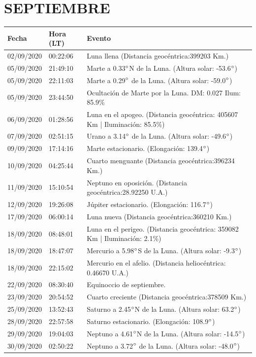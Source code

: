 \documentclass[12pt,a4paper,oneside]{article}
\begin{document}
\section{SEPTIEMBRE}
\begin{center}
\begin{tabular}{ |l| l| l| }
\hline
 \textbf{Fecha} & \textbf{Hora (LT)} & \textbf{Evento}\\
 \hline
02/09/2020 &  00:22:06   &  Luna llena (Distancia geocéntrica:399203 Km.)	  \\
05/09/2020 &  21:49:10   &  Marte a 0.33$\degree$N de la Luna. (Altura solar: -53.6$\degree$)	  \\
05/09/2020 &  22:11:03   &  Marte a 0.29$\degree$ de la Luna. (Altura solar: -59.0$\degree$)	  \\
05/09/2020 &  23:44:50   &  Ocultación de Marte por la Luna. DM: 0.027 Ilum: 85.9\%   \\
06/09/2020 &  01:28:56   &  Luna en el apogeo. (Distancia geocéntrica: 405607 Km | Iluminación: 85.5\%)	  \\
07/09/2020 &  02:51:15   &  Urano a 3.14$\degree$ de la Luna. (Altura solar: -49.6$\degree$)	  \\
09/09/2020 &  17:14:16   &  Marte estacionario. (Elongación: 139.4$\degree$)	  \\
10/09/2020 &  04:25:44   &  Cuarto menguante (Distancia geocéntrica:396234 Km.)	  \\
11/09/2020 &  15:10:54   &  Neptuno en oposición. (Distancia geocéntrica:28.92250 U.A.)	  \\
12/09/2020 &  19:26:08   &  Júpiter estacionario. (Elongación: 116.7$\degree$)	  \\
17/09/2020 &  06:00:14   &  Luna nueva (Distancia geocéntrica:360210 Km.)	  \\
18/09/2020 &  08:48:01   &  Luna en el perigeo. (Distancia geocéntrica: 359082 Km | Iluminación: 2.1\%)	  \\
18/09/2020 &  18:47:07   &  Mercurio a 5.98$\degree$S de la Luna. (Altura solar: -9.3$\degree$)	  \\ 
18/09/2020 &  22:15:02   &  Mercurio en el afelio. (Distancia heliocéntrica: 0.46670 U.A.)	  \\ 
22/09/2020 &  08:30:40   &  Equinoccio de septiembre.	  \\
23/09/2020 &  20:54:52   &  Cuarto creciente (Distancia geocéntrica:378509 Km.)	  \\
25/09/2020 &  13:52:43   &  Saturno a 2.45$\degree$N de la Luna. (Altura solar: 63.2$\degree$)	  \\
28/09/2020 &  22:57:58   &  Saturno estacionario. (Elongación: 108.9$\degree$)	  \\
29/09/2020 &  19:04:03   &  Neptuno a 4.61$\degree$N de la Luna. (Altura solar: -14.5$\degree$)	  \\
30/09/2020 &  02:50:22   &  Neptuno a 3.72$\degree$ de la Luna. (Altura solar: -48.0$\degree$)	  \\ 
\hline
\end{tabular}
\end{center}
\end{document}
